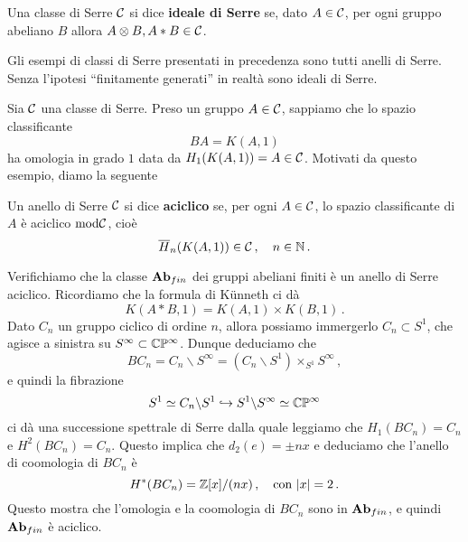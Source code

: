 \begin{df}
	Una classe di Serre $\mathcal{C}$ si dice \textbf{ideale di Serre}
	se, dato $A \in \mathcal{C}$, per ogni gruppo abeliano $B$
	allora $A \otimes B, A \ast B \in \mathcal{C}$.
\end{df}

\begin{ex}
	Gli esempi di classi di Serre presentati in precedenza sono tutti anelli di Serre.
	Senza l'ipotesi ``finitamente generati'' in realtà sono ideali di Serre.
\end{ex}

Sia $\mathcal{C}$ una classe di Serre. Preso un gruppo $A \in \mathcal{C}$,
sappiamo che lo spazio classificante
\begin{equation*}
	BA = K(A,1)
\end{equation*}
ha omologia in grado $1$ data da $H_{1}(K(A,1)) = A \in \mathcal{C}$.
Motivati da questo esempio, diamo la seguente

\begin{df}
	Un anello di Serre $\mathcal{C}$ si dice \textbf{aciclico}
	se, per ogni $A \in \mathcal{C}$, lo spazio classificante di $A$
	è aciclico $\mathrm{mod}\mathcal{C}$, cioè
	\begin{equation*}
	 	\overline{H}_{n}(K(A,1)) \in \mathcal{C}\,, \quad n \in {\mathbb N}\,.
	 \end{equation*} 
\end{df}

\begin{ex}
	Verifichiamo che la classe ${\normalfont\textbf{Ab}}_{fin}$ dei gruppi abeliani finiti 
	è un anello di Serre aciclico.
	Ricordiamo che la formula di Künneth ci dà
	\begin{equation*}
		K(A \ast B,1) = K(A,1) \times K(B,1)\,.
	\end{equation*}
	Dato $C_{n}$ un gruppo ciclico di ordine $n$, 
	allora possiamo immergerlo $C_{n} \subset S^{1}$,
	che agisce a sinistra su $S^{\infty} \subset \mathbb{C}\mathbb{P}^{\infty}$.
	Dunque deduciamo che
	\begin{equation*}
		BC_{n} = C_{n }\backslash S^{\infty}= \left(  C_{n }\backslash S^{1}\right) \times_{S^{1}} S^{\infty}\,,
	\end{equation*}
	e quindi la fibrazione 
	$$S^{1} \simeq C_{n} \backslash S^{1} \hookrightarrow S^{1} \backslash S^{\infty}
	\simeq \mathbb{C} \mathbb{P}^{\infty}$$
	ci dà una successione spettrale di Serre
	dalla quale leggiamo che $H_{1}(BC_{n}) = C_{n}$ e $H^{2}(BC_{n})=C_{n}$.
	Questo implica che $d_{2}(e) = \pm n x$ e deduciamo che 
	l'anello di coomologia di $BC_{n}$ è 
	\begin{equation*}
		H^{*}(BC_{n}) = {\mathbb Z}[x]/(nx)\,, \quad \text{con } |x| = 2\,.
	\end{equation*}
	Questo mostra che l'omologia e la coomologia di $BC_{n}$
	sono in ${\normalfont\textbf{Ab}}_{fin}$, e quindi ${\normalfont\textbf{Ab}}_{fin}$ è aciclico.
\end{ex}

